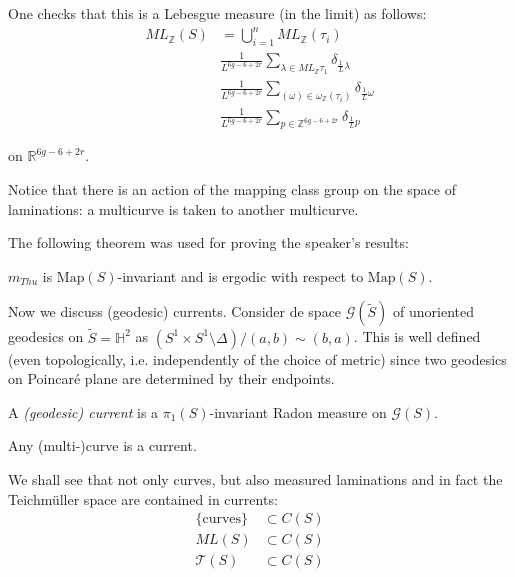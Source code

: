 \noindent
One checks that this is a Lebesgue measure
(in the limit) as follows:
$$
\begin{aligned}
ML_{\mathbb{Z}}(S)&=\bigcup_{i=1}
^nML_{\mathbb{Z}}(\tau_i)\\
&\frac{1}{L^{6g-6+2r}}\sum_{\lambda \in
ML_{\mathbb{Z}}\tau_1}
\delta_{\frac{1}{L}\lambda}\\
&\frac{1}{L^{6g-6+2r}}\sum_{(\omega)\in
\omega_{\mathbb{Z}}(\tau_i)}
\delta_{\frac{1}{L}\omega}\\
&\frac{1}{L^{6g-6+2r}}\sum_{p \in
\mathbb{Z}^{6g-6+2r}}
\delta_{\frac{1}{L}p}
\end{aligned}
$$

\noindent
on $\mathbb{R}^{6g-6+2r}$.

Notice that there is an action of the mapping
class group
on the space of laminations: a multicurve is
taken to another multicurve.

The following theorem was used for proving
the speaker's results:

\begin{theorem}[Masur '85]
\label{theorem-masur-85}
$m_{Thu}$ is $\text{Map}(S)$-invariant
and is ergodic with respect to
$\text{Map}(S)$.
\end{theorem}

\medskip\noindent
Now we discuss (geodesic) currents.
Consider de space $\mathcal{G}(\tilde{S})$
of unoriented geodesics on
$\tilde{S}=\mathbb{H}^2$
as $(S^1\times S^1\setminus\Delta)/(a,b)\sim
(b,a)$.
This  is well defined (even topologically,
i.e.
independently of the choice of metric)
since two geodesics on Poincaré plane are
determined by their endpoints.

\begin{definition}
\label{definition-geodesic-current}
A {\it (geodesic) current} is a
$\pi_1(S)$-invariant
Radon measure on $\mathcal{G}(S)$.
\end{definition}

\begin{example}
\label{example-multicurves-are-currents}
Any (multi-)curve is a current.
\end{example}

\noindent
We shall see that not only curves, but also
measured laminations
and in fact the Teichmüller space are
contained in currents:
$$
\begin{aligned}
\{\text{curves}\}&\subset C(S)\\
ML(S)&\subset C(S)\\
\mathcal{T}(S)&\subset C(S)
\end{aligned}
$$

